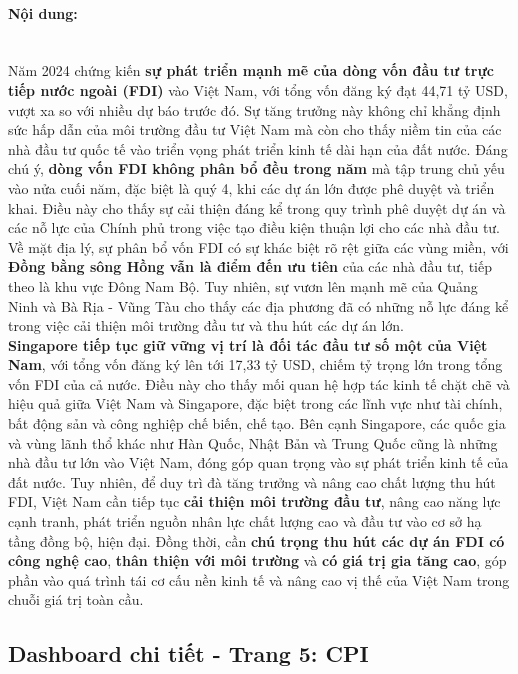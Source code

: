 \documentclass[a4paper]{report}
\begin{document}
{{\paragraph{Nội dung: } \mbox{}\\

Năm 2024 chứng kiến \textbf{sự phát triển mạnh mẽ của dòng vốn đầu tư trực tiếp nước ngoài (FDI)} vào Việt Nam, với tổng vốn đăng ký đạt 44,71 tỷ USD, vượt xa so với nhiều dự báo trước đó\cite{ref}.
Sự tăng trưởng này không chỉ khẳng định sức hấp dẫn của môi trường đầu tư Việt Nam mà còn cho thấy niềm tin của các nhà đầu tư quốc tế vào triển vọng phát triển kinh tế dài hạn của đất nước. Đáng chú ý, \textbf{dòng vốn FDI không phân bổ đều trong năm} mà tập trung chủ yếu vào nửa cuối năm, đặc biệt là quý 4, khi các dự án lớn được phê duyệt và triển khai. Điều này cho thấy sự cải thiện đáng kể trong quy trình phê duyệt dự án và các nỗ lực của Chính phủ trong việc tạo điều kiện thuận lợi cho các nhà đầu tư. Về mặt địa lý, sự phân bổ vốn FDI có sự khác biệt rõ rệt giữa các vùng miền, với \textbf{Đồng bằng sông Hồng vẫn là điểm đến ưu tiên} của các nhà đầu tư, tiếp theo là khu vực Đông Nam Bộ. Tuy nhiên, sự vươn lên mạnh mẽ của Quảng Ninh và Bà Rịa - Vũng Tàu cho thấy các địa phương đã có những nỗ lực đáng kể trong việc cải thiện môi trường đầu tư và thu hút các dự án lớn.\\

\textbf{Singapore tiếp tục giữ vững vị trí là đối tác đầu tư số một của Việt Nam}, với tổng vốn đăng ký lên tới 17,33 tỷ USD, chiếm tỷ trọng lớn trong tổng vốn FDI của cả nước. Điều này cho thấy mối quan hệ hợp tác kinh tế chặt chẽ và hiệu quả giữa Việt Nam và Singapore, đặc biệt trong các lĩnh vực như tài chính, bất động sản và công nghiệp chế biến, chế tạo. Bên cạnh Singapore, các quốc gia và vùng lãnh thổ khác như Hàn Quốc, Nhật Bản và Trung Quốc cũng là những nhà đầu tư lớn vào Việt Nam, đóng góp quan trọng vào sự phát triển kinh tế của đất nước. Tuy nhiên, để duy trì đà tăng trưởng và nâng cao chất lượng thu hút FDI, Việt Nam cần tiếp tục \textbf{cải thiện môi trường đầu tư}, nâng cao năng lực cạnh tranh, phát triển nguồn nhân lực chất lượng cao và đầu tư vào cơ sở hạ tầng đồng bộ, hiện đại. Đồng thời, cần \textbf{chú trọng thu hút các dự án FDI có công nghệ cao}, \textbf{thân thiện với môi trường} và \textbf{có giá trị gia tăng cao}, góp phần vào quá trình tái cơ cấu nền kinh tế và nâng cao vị thế của Việt Nam trong chuỗi giá trị toàn cầu.

\newpage
\subsection{Dashboard chi tiết - Trang 5: CPI}

}}
\end{document}
